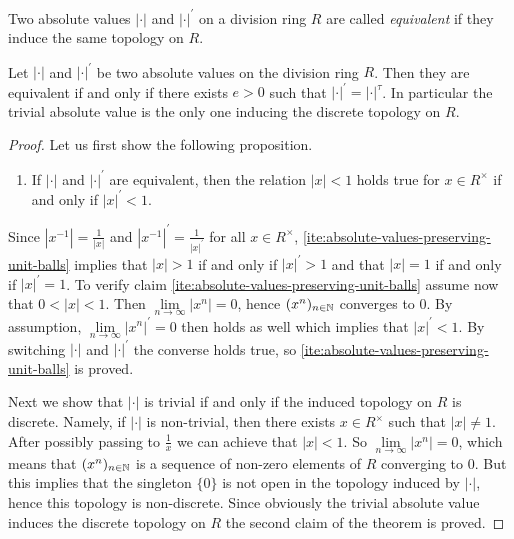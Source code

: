 \begin{definition}
  Two absolute values $|\cdot|$ and $|\cdot|^\prime$ on a division ring $R$ are called \emph{equivalent}
  if they induce the same topology on $R$. 
\end{definition}

\begin{theorem}
  Let $|\cdot|$ and $|\cdot|^\prime$ be two absolute values on the division ring $R$.
  Then they are equivalent if and only if there exists $e>0$ such that $|\cdot|^\prime =|\cdot|^\tau$.
  In particular the trivial absolute value is the only one inducing the discrete topology on $R$. 
\end{theorem}

\begin{proof}
  Let us first show the following proposition.
  \begin{enumerate}[label={\textup{({\sffamily A})}},align=left,leftmargin=*]
  \item\label{ite:absolute-values-preserving-unit-balls} 
    If $|\cdot|$ and $|\cdot|^\prime$ are equivalent, then  the relation $|x|< 1$ holds true for $x \in R^\times$
    if and only if $|x|^\prime< 1$. 
  \end{enumerate}
  Since $\left| x^{-1}\right| =\frac{1}{|x|}$ and $\left| x^{-1}\right|^\prime =\frac{1}{|x|^\prime}$
  for all $x \in R^\times$, \ref{ite:absolute-values-preserving-unit-balls}
  implies that $|x|> 1$ if and only if $|x|^\prime> 1$ and that  $|x|= 1$ if and only if $|x|^\prime = 1$.
  To verify claim \ref{ite:absolute-values-preserving-unit-balls} assume now that $0 < |x|< 1$.
  Then  $\lim\limits_{n\to\infty}|x^n|=0$, hence $(x^n)_{n\in\mathbb{N}}$ converges to $0$. By assumption,
  $\lim\limits_{n\to\infty}|x^n|^\prime=0$ then holds as well which implies that $|x|^\prime<1$.
  By switching  $|\cdot|$ and $|\cdot|^\prime$  the converse holds true, so
  \ref{ite:absolute-values-preserving-unit-balls} is proved.
  

  Next we show that $|\cdot|$ is trivial  if and only if the induced topology on $R$ is discrete.
  Namely, if  $|\cdot|$ is non-trivial, then there exists $x\in R^\times$ such  that  $|x| \neq 1$. After
  possibly passing to $\frac 1x$ we can achieve that  $|x| < 1$. So $\lim\limits_{n\to\infty}|x^n|=0$, which
  means that $(x^n)_{n\in\mathbb{N}}$ is a sequence of non-zero elements of $R$ converging to $0$. But this implies that
  the singleton $\{ 0\}$ is not  open in the topology induced by $|\cdot|$, hence this topology is non-discrete. 
  Since obviously the trivial absolute value induces the discrete topology on $R$ the second claim of the theorem is
  proved.
  

\end{proof}
